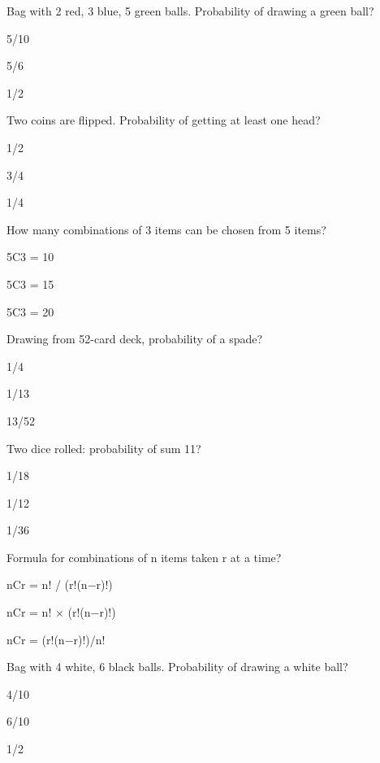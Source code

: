 \begin{enhancedmcq}{Bag with 2 red, 3 blue, 5 green balls. Probability of drawing a green ball?}
\item 5/10
\item 5/6
\item 1/2

\end{enhancedmcq}
\begin{enhancedmcq}{Two coins are flipped. Probability of getting at least one head?}
\item 1/2
\item 3/4
\item 1/4

\end{enhancedmcq}
\begin{enhancedmcq}{How many combinations of 3 items can be chosen from 5 items?}
\item 5C3 = 10
\item 5C3 = 15
\item 5C3 = 20

\end{enhancedmcq}
\begin{enhancedmcq}{Drawing from 52-card deck, probability of a spade?}
\item 1/4
\item 1/13
\item 13/52

\end{enhancedmcq}
\begin{enhancedmcq}{Two dice rolled: probability of sum 11?}
\item 1/18
\item 1/12
\item 1/36

\end{enhancedmcq}
\begin{enhancedmcq}{Formula for combinations of n items taken r at a time?}
\item nCr = n! / (r!(n−r)!)
\item nCr = n! × (r!(n−r)!)
\item nCr = (r!(n−r)!)/n!

\end{enhancedmcq}
\begin{enhancedmcq}{Bag with 4 white, 6 black balls. Probability of drawing a white ball?}
\item 4/10
\item 6/10
\item 1/2

\end{enhancedmcq}
